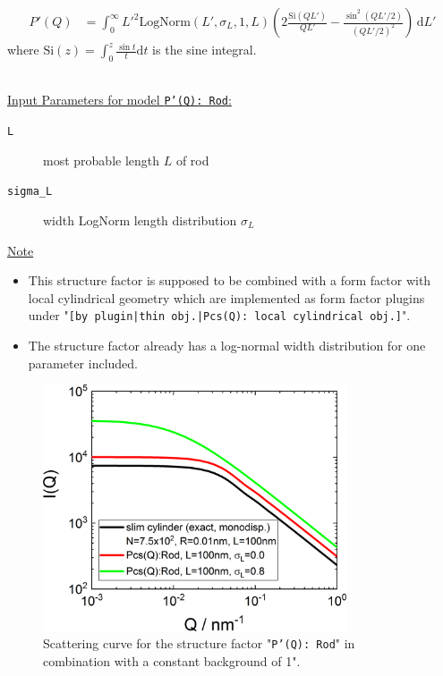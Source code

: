 \begin{align}
P'(Q) &= \int_0^\infty L'^2 \mathrm{LogNorm}(L',\sigma_L,1,L) \left(2 \frac{\mathrm{Si}(QL')}{QL'}-\frac{\sin^2(QL'/2)}{(QL'/2)^2} \right)\, \mathrm{d}L'
\end{align}
where $\mathrm{Si}(z)=\int_0^z\frac{\sin t}{t} \mathrm{d}t$ is the sine integral.

\vspace{5mm}

\hspace{1pt}\\
\underline{Input Parameters for model \texttt{P'(Q): Rod}:}\\
\begin{description}
\item[\texttt{L}]most probable length $L$ of rod
\item[\texttt{sigma\_L}] width LogNorm length distribution $\sigma_L$
\end{description}

\noindent
\underline{Note}
\begin{itemize}
  \item This structure factor is supposed to be combined with a form factor with local cylindrical geometry which are implemented as form factor plugins
under "\texttt{[by plugin|thin obj.|Pcs(Q): local cylindrical obj.]}".
\item The structure factor already has a log-normal width distribution for one parameter included.
\end{itemize}


\begin{figure}[htb]
\begin{center}
\includegraphics[width=0.8\textwidth,height=0.55\textwidth]{../images/form_factor/anisotropic/PprimeRod.png}
\end{center}
\caption{Scattering curve for the structure factor "\texttt{P'(Q): Rod}" in combination with a constant background of 1".}
\label{fig_IQ:PprimeRod}
\end{figure}

